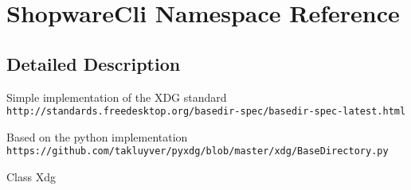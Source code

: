 \section{Shopware\+Cli Namespace Reference}
\label{namespace_shopware_cli}


\subsection{Detailed Description}
Simple implementation of the X\+D\+G standard {\tt http\+://standards.\+freedesktop.\+org/basedir-\/spec/basedir-\/spec-\/latest.\+html}

Based on the python implementation {\tt https\+://github.\+com/takluyver/pyxdg/blob/master/xdg/\+Base\+Directory.\+py}

Class Xdg  